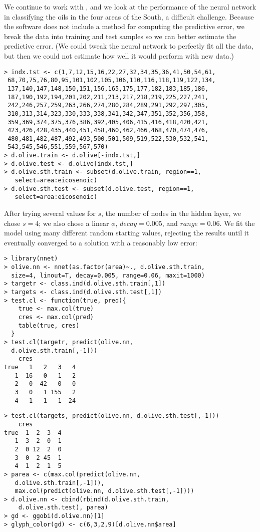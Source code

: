 We continue to work with , and we look at the
performance of the neural network in classifying the oils in the four
areas of the South, a difficult challenge. Because the software
does not include a method for computing the predictive error, we break
the data into training and test samples so we can better estimate the
predictive error.  (We could tweak the neural network to perfectly fit
all the data, but then we could not estimate how well it would perform
with new data.)

\begin{verbatim}
> indx.tst <- c(1,7,12,15,16,22,27,32,34,35,36,41,50,54,61,
 68,70,75,76,80,95,101,102,105,106,110,116,118,119,122,134,
 137,140,147,148,150,151,156,165,175,177,182,183,185,186,
 187,190,192,194,201,202,211,213,217,218,219,225,227,241,
 242,246,257,259,263,266,274,280,284,289,291,292,297,305,
 310,313,314,323,330,333,338,341,342,347,351,352,356,358,
 359,369,374,375,376,386,392,405,406,415,416,418,420,421,
 423,426,428,435,440,451,458,460,462,466,468,470,474,476,
 480,481,482,487,492,493,500,501,509,519,522,530,532,541,
 543,545,546,551,559,567,570)
> d.olive.train <- d.olive[-indx.tst,]
> d.olive.test <- d.olive[indx.tst,]
> d.olive.sth.train <- subset(d.olive.train, region==1, 
   select=area:eicosenoic)
> d.olive.sth.test <- subset(d.olive.test, region==1, 
   select=area:eicosenoic)
\end{verbatim}


After trying several values for $s$, the number of nodes in the hidden
layer, we chose $s=4$; we also chose a linear $\phi$, $decay=0.005$,
and $range=0.06$. We fit the model using many different random
starting values, rejecting the results until it eventually converged
to a solution with a reasonably low error:

\begin{verbatim}
> library(nnet)
> olive.nn <- nnet(as.factor(area)~., d.olive.sth.train, 
  size=4, linout=T, decay=0.005, range=0.06, maxit=1000)
> targetr <- class.ind(d.olive.sth.train[,1])
> targets <- class.ind(d.olive.sth.test[,1])
> test.cl <- function(true, pred){
    true <- max.col(true)
    cres <- max.col(pred)
    table(true, cres)
  }
> test.cl(targetr, predict(olive.nn, 
  d.olive.sth.train[,-1]))
    cres
true   1   2   3   4
   1  16   0   1   2
   2   0  42   0   0
   3   0   1 155   2
   4   1   1   1  24
\end{verbatim}
\newpage  %
\begin{verbatim}
> test.cl(targets, predict(olive.nn, d.olive.sth.test[,-1]))
    cres
true  1  2  3  4
   1  3  2  0  1
   2  0 12  2  0
   3  0  2 45  1
   4  1  2  1  5
> parea <- c(max.col(predict(olive.nn, 
   d.olive.sth.train[,-1])),
   max.col(predict(olive.nn, d.olive.sth.test[,-1])))
> d.olive.nn <- cbind(rbind(d.olive.sth.train, 
    d.olive.sth.test), parea)
> gd <- ggobi(d.olive.nn)[1]
> glyph_color(gd) <- c(6,3,2,9)[d.olive.nn$area]
\end{verbatim}


